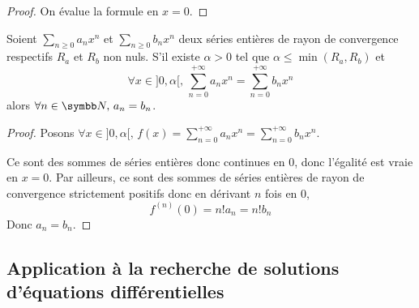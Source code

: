 \begin{proof}
    On évalue la formule en $x = 0$. 
\end{proof}

\begin{corollaire}{}{}
    Soient $\sum_{n \geqslant 0} a_n x^n$ et $\sum_{n \geqslant 0} b_n x^n$ deux séries entières
    de rayon de convergence respectifs $R_a$ et $R_b$ non nuls. S'il existe $\alpha > 0$ tel que 
    $\alpha \leqslant \min(R_a, R_b)$ et 
    $$\forall x \in ]0, \alpha[, \, \sum_{n = 0}^{+\infty} a_n x^n = \sum_{n = 0}^{+\infty} b_n x^n$$
    alors $\forall n \in \N, \, a_n = b_n$.
\end{corollaire}

\begin{proof}
    Posons $\displaystyle \forall x \in ]0, \alpha[, \, f(x) = \sum_{n = 0}^{+\infty} a_n x^n = \sum_{n = 0}^{+\infty} b_n x^n$. 

    Ce sont des sommes de séries entières donc continues en $0$, donc l'égalité est vraie en 
    $x = 0$. Par ailleurs, ce sont des sommes de séries entières de rayon de convergence 
    strictement positifs donc en dérivant $n$ fois en $0$, 
    $$f^{(n)}(0) = n ! a_n = n! b_n$$
    Donc $a_n = b_n$.
\end{proof}

\subsection{Application à la recherche de solutions d'équations différentielles}

